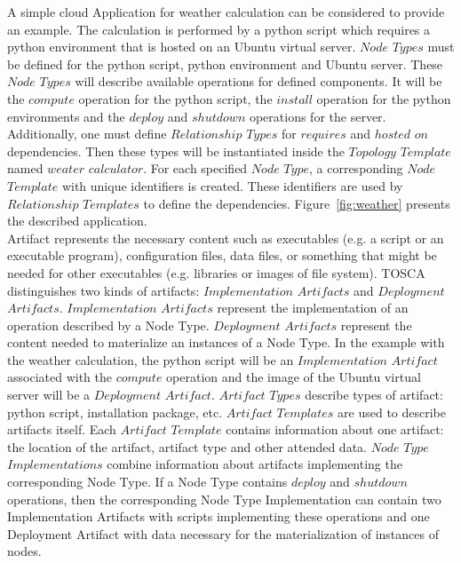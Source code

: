 A simple cloud Application for weather calculation can be considered to provide an example. 
The calculation is performed by a python script which requires a python environment that is hosted on an Ubuntu virtual server.
$Node$ $Types$ must be defined for the python script, python environment and Ubuntu server.  
These $Node$ $Types$ will describe available operations for defined components.
It will be the $compute$ operation for the python script, the $install$ operation for the python environments and the $deploy$ and $shutdown$ operations for the server.
Additionally, one must define $Relationship$ $Types$ for $requires$ and $hosted$ $on$ dependencies.
Then these types will be instantiated inside the $Topology$ $Template$ named $weater$ $calculator$.
For each specified $Node$ $Type$, a corresponding $Node$ $Template$ with unique identifiers is created.
These identifiers are used by $Relationship$ $Templates$ to define the dependencies.
Figure~\ref{fig:weather} presents the described application. \\
Artifact represents the necessary content such as executables (e.g. a script or an executable program), configuration files, data files, or something that might be needed for other executables (e.g. libraries or images of file system).
TOSCA distinguishes two kinds of artifacts: $Implementation$ $Artifacts$ and $Deployment$ $Artifacts$.
$Implementation$ $Artifacts$ represent the implementation of an operation described by a Node Type.
$Deployment$ $Artifacts$ represent the content needed to materialize an instances of a Node Type.
In the example with the weather calculation, the python script will be an $Implementation$ $Artifact$ associated with the $compute$ operation and the image of the Ubuntu virtual server will be a $Deployment$ $Artifact$.
$Artifact$ $Types$ describe types of artifact: python script, installation package, etc.
$Artifact$ $Templates$ are used to describe artifacts itself.
Each $Artifact$ $Template$ contains information about one artifact: the location of the artifact, artifact type and other attended data. 
$Node$ $Type$ $Implementations$ combine information about artifacts implementing the corresponding Node Type.
If a Node Type contains $deploy$ and $shutdown$ operations, then the corresponding Node Type Implementation can contain two Implementation Artifacts with scripts implementing these operations and one Deployment Artifact with data necessary for the materialization of instances of nodes. %
